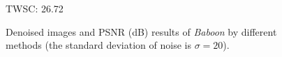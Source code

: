 \begin{figure}[t!]
{\begin{minipage}[t]{0.19\textwidth}
{\footnotesize TWSC: 26.72}
\end{minipage}
}\vspace{-3mm}
\caption{Denoised images and PSNR (dB) results of \textsl{Baboon} by different methods (the standard deviation of noise is $\sigma=20$).}
    \label{fig5-2}
\end{figure}



\begin{figure}[t!]
    \centering
{}
\end{figure}
